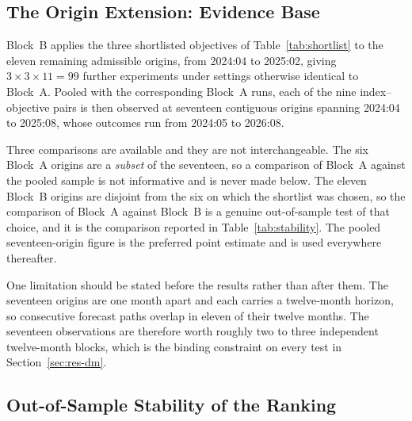 \documentclass[12pt]{article}
\begin{document}
\subsection{The Origin Extension: Evidence Base}
\label{sec:res-blockB}

Block~B applies the three shortlisted objectives of
Table~\ref{tab:shortlist} to the eleven remaining admissible origins, from
2024:04 to 2025:02, giving $3\times3\times11 = 99$ further experiments under
settings otherwise identical to Block~A. Pooled with the corresponding Block~A
runs, each of the nine index--objective pairs is then observed at seventeen
contiguous origins spanning 2024:04 to 2025:08, whose outcomes run from
2024:05 to 2026:08.

Three comparisons are available and they are not interchangeable. The six
Block~A origins are a \emph{subset} of the seventeen, so a comparison of
Block~A against the pooled sample is not informative and is never made below.
The eleven Block~B origins are disjoint from the six on which the shortlist was
chosen, so the comparison of Block~A against Block~B is a genuine out-of-sample
test of that choice, and it is the comparison reported in
Table~\ref{tab:stability}. The pooled seventeen-origin figure is the preferred
point estimate and is used everywhere thereafter.

One limitation should be stated before the results rather than after them. The
seventeen origins are one month apart and each carries a twelve-month horizon,
so consecutive forecast paths overlap in eleven of their twelve months. The
seventeen observations are therefore worth roughly two to three independent
twelve-month blocks, which is the binding constraint on every test in
Section~\ref{sec:res-dm}.

\subsection{Out-of-Sample Stability of the Ranking}
\label{sec:res-stability}
\end{document}

